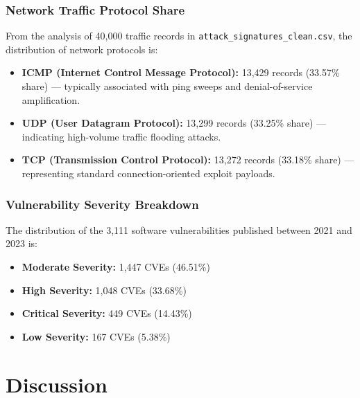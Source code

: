 \documentclass[a4paper, 12pt]{report}
\begin{document}
\subsection{Network Traffic Protocol Share}
From the analysis of 40,000 traffic records in \texttt{attack\_signatures\_clean.csv}, the distribution of network protocols is:
\begin{itemize}
    \item \textbf{ICMP (Internet Control Message Protocol):} 13,429 records (33.57\% share) --- typically associated with ping sweeps and denial-of-service amplification.
    \item \textbf{UDP (User Datagram Protocol):} 13,299 records (33.25\% share) --- indicating high-volume traffic flooding attacks.
    \item \textbf{TCP (Transmission Control Protocol):} 13,272 records (33.18\% share) --- representing standard connection-oriented exploit payloads.
\end{itemize}

\subsection{Vulnerability Severity Breakdown}
The distribution of the 3,111 software vulnerabilities published between 2021 and 2023 is:
\begin{itemize}
    \item \textbf{Moderate Severity:} 1,447 CVEs (46.51\%)
    \item \textbf{High Severity:} 1,048 CVEs (33.68\%)
    \item \textbf{Critical Severity:} 449 CVEs (14.43\%)
    \item \textbf{Low Severity:} 167 CVEs (5.38\%)
\end{itemize}

\chapter{Discussion}
\end{document}
